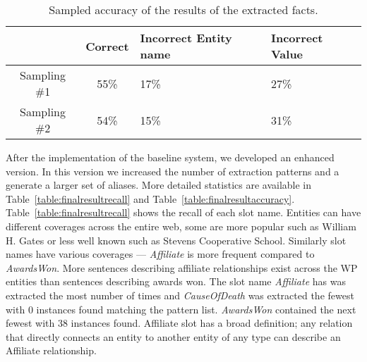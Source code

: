 \begin{table}
\caption{Sampled accuracy of the results of the extracted facts.}
\centering
\label{table:initialresult}

\begin{tabular}{| c | c | p{2cm} | p{13mm} |}
\hline 
 & \textbf{Correct} & \textbf{Incorrect Entity name} & \textbf{Incorrect Value} \\ 
\hline 
Sampling \#1 & 55\% & 17\% & 27\% \\ 
\hline Sampling \#2 & 54\% & 15\% & 31\%  \\ 
\hline 
\end{tabular} 
\end{table}


After the implementation of the baseline system, we developed an enhanced version. 
In this version we increased the number of extraction patterns and a generate a larger set of aliases.
More detailed statistics are available in Table~\ref{table:finalresultrecall} and Table~\ref{table:finalresultaccuracy}.
Table~\ref{table:finalresultrecall} shows the recall of each slot name. 
Entities can have different coverages across the entire web, some are more popular such as William H. Gates or less well known such as Stevens Cooperative School.
Similarly slot names have various coverages --- \textit{Affiliate} is more frequent compared to \textit{AwardsWon}. 
More sentences describing affiliate relationships exist across the WP entities than
sentences describing awards won. %
The slot name \textit{Affiliate} has was extracted the most number of times and \textit{CauseOfDeath} was extracted the
fewest with 0 instances found matching the pattern list. \textit{AwardsWon} contained the next fewest with 38 instances found. 
Affiliate slot has a broad definition; any relation that directly connects an entity to another entity of any type can describe an Affiliate relationship.


